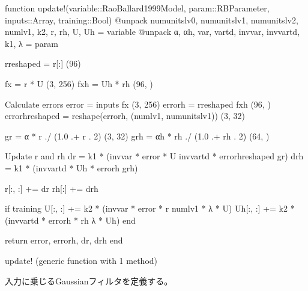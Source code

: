 \documentclass[letterpaper,10pt,english]{sphinxmanual}
\begin{document}
\begin{sphinxVerbatim}[commandchars=\\\{\}]
function update!(variable::RaoBallard1999Model, param::RBParameter, inputs::Array, training::Bool)
    @unpack num\PYGZus{}units\PYGZus{}lv0, num\PYGZus{}units\PYGZus{}lv1, num\PYGZus{}units\PYGZus{}lv2, num\PYGZus{}lv1, k2, r, rh, U, Uh = variable
    @unpack α, αh, var, vartd, inv\PYGZus{}var, inv\PYGZus{}vartd, k1, λ = param

    r\PYGZus{}reshaped = r[:] \PYGZsh{} (96)

    fx = r * U\PYGZsq{} \PYGZsh{} (3, 256)
    fxh = Uh * rh \PYGZsh{} (96, )

    \PYGZsh{} Calculate errors
    error = inputs \PYGZhy{} fx \PYGZsh{} (3, 256)
    errorh = r\PYGZus{}reshaped \PYGZhy{} fxh \PYGZsh{} (96, ) 
    errorh\PYGZus{}reshaped = reshape(errorh, (num\PYGZus{}lv1, num\PYGZus{}units\PYGZus{}lv1)) \PYGZsh{} (3, 32)

    g\PYGZus{}r = α * r ./ (1.0 .+ r .\PYGZca{} 2) \PYGZsh{} (3, 32)
    g\PYGZus{}rh = αh * rh ./ (1.0 .+ rh .\PYGZca{} 2) \PYGZsh{} (64, )

    \PYGZsh{} Update r and rh
    dr = k1 * (inv\PYGZus{}var * error * U \PYGZhy{} inv\PYGZus{}vartd * errorh\PYGZus{}reshaped \PYGZhy{} g\PYGZus{}r)
    drh = k1 * (inv\PYGZus{}vartd * Uh\PYGZsq{} * errorh \PYGZhy{} g\PYGZus{}rh)
    
    r[:, :] += dr
    rh[:] += drh
    
    if training 
        U[:, :] += k2 * (inv\PYGZus{}var * error\PYGZsq{} * r \PYGZhy{} num\PYGZus{}lv1 * λ * U)
        Uh[:, :] += k2 * (inv\PYGZus{}vartd * errorh * rh\PYGZsq{} \PYGZhy{} λ * Uh)
    end

    return error, errorh, dr, drh
end
\end{sphinxVerbatim}

\begin{sphinxVerbatim}[commandchars=\\\{\}]
update! (generic function with 1 method)
\end{sphinxVerbatim}

入力に乗じるGaussianフィルタを定義する。
\end{document}

